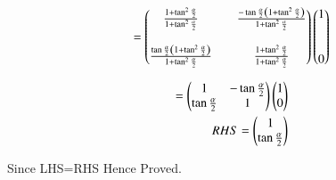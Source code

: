 \documentclass[journal,12pt,onecolumn]{IEEEtran}
\begin{document}
\begin{align}
    =\begin{pmatrix}\frac{1+\tan^2\frac{\alpha}{2}}{1+\tan^2\frac{\alpha}{2}} && \frac{-\tan\frac{\alpha}{2}\left(1+\tan^2\frac{\alpha}{2}\right)}{1+\tan^2\frac{\alpha}{2}}\\ \\ \frac{\tan\frac{\alpha}{2}\left(1+\tan^2\frac{\alpha}{2}\right)}{1+\tan^2\frac{\alpha}{2}} && \frac{1+\tan^2\frac{\alpha}{2}}{1+\tan^2\frac{\alpha}{2}}  \end{pmatrix}\begin{pmatrix}1 \\ \\ \\ 0\end{pmatrix}
\end{align}

\begin{align}
 =\begin{pmatrix}1 &  -\tan\frac{\alpha}{2} \\ \tan\frac{\alpha}{2} & 1 \end{pmatrix}\begin{pmatrix}1 \\ 0\end{pmatrix}\\
 RHS=\begin{pmatrix}1 \\ \tan\frac{\alpha}{2}\end{pmatrix}
\end{align}

Since LHS=RHS Hence Proved.
\end{document}
